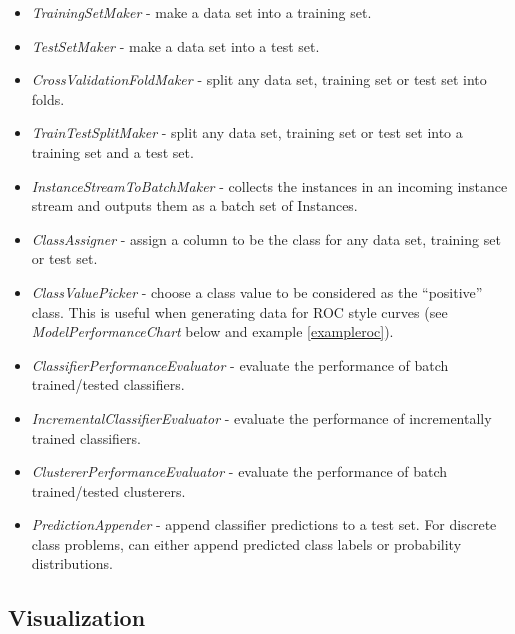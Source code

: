 \begin{itemize}
	\item \textit{TrainingSetMaker} - make a data set into a training set.
	\item \textit{TestSetMaker} - make a data set into a test set.
	\item \textit{CrossValidationFoldMaker} - split any data set, training 
	set or test set into folds.
	\item \textit{TrainTestSplitMaker} - split any data set, training set 
	or test set into a training set and a test set.
        \item \textit{InstanceStreamToBatchMaker} - collects the instances in
          an incoming instance stream and outputs them as a batch set of Instances.
	\item \textit{ClassAssigner} - assign a column to be the class for any 
	data set, training set or test set.
	\item \textit{ClassValuePicker} - choose a class value to be considered 
	as the ``positive'' class. This is useful when generating data for ROC style 
	curves (see \textit{ModelPerformanceChart} below and example \ref{exampleroc}).
	\item \textit{ClassifierPerformanceEvaluator} - evaluate the performance of 
	batch trained/tested classifiers.
	\item \textit{IncrementalClassifierEvaluator} - evaluate the performance of 
	incrementally trained classifiers.
	\item \textit{ClustererPerformanceEvaluator} - evaluate the performance of 
	batch trained/tested clusterers.
	\item \textit{PredictionAppender} - append classifier predictions to a test 
	set. For discrete class problems, can either append predicted class labels or
	probability distributions.
\end{itemize}

\subsection{Visualization}

